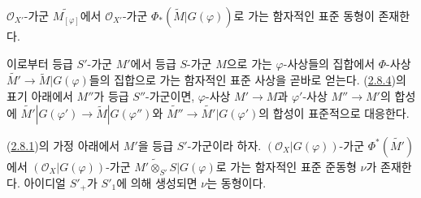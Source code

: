 \begin{proposition}[2.8.7]
\label{II.2.8.7-ko}
$\mathcal{O}_{X'}$-가군 $\widetilde{M_{[\varphi]}}$에서
$\mathcal{O}_{X'}$-가군 $\Phi_*(\widetilde{M}|G(\varphi))$로 가는
함자적인 표준 동형이 존재한다.
\end{proposition}

이로부터 등급 $S'$-가군 $M'$에서 등급 $S$-가군 $M$으로 가는
$\varphi$-사상들의 집합에서 $\Phi$-사상
$\widetilde{M'}\to\widetilde{M}|G(\varphi)$들의 집합으로 가는 함자적인
표준 사상을 곧바로 얻는다. (\hyperref[II.2.8.4-ko]{2.8.4})의 표기
아래에서 $M''$가 등급 $S''$-가군이면, $\varphi$-사상 $M'\to M$과
$\varphi'$-사상 $M''\to M'$의 합성에
$\widetilde{M'}|G(\varphi')\to\widetilde{M}|G(\varphi'')$와
$\widetilde{M''}\to\widetilde{M'}|G(\varphi')$의 합성이 표준적으로
대응한다.

\begin{proposition}[2.8.8]
\label{II.2.8.8-ko}
(\hyperref[II.2.8.1-ko]{2.8.1})의 가정 아래에서 $M'$을 등급
$S'$-가군이라 하자. $(\mathcal{O}_X|G(\varphi))$-가군
$\Phi^*(\widetilde{M'})$에서 $(\mathcal{O}_X|G(\varphi))$-가군
$\widetilde{M'\otimes_{S'}S}|G(\varphi)$로 가는 함자적인 표준 준동형
$\nu$가 존재한다. 아이디얼 $S'_+$가 $S'_1$에 의해 생성되면
$\nu$는 동형이다.
\end{proposition}

